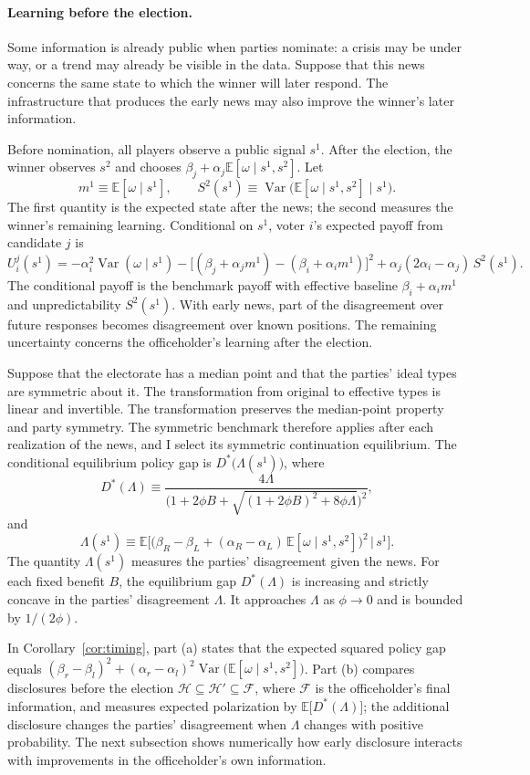\documentclass[12pt,letterpaper]{article}
\begin{document}
\paragraph{Learning before the election.}
Some information is already public when parties nominate: a crisis may be under way, or a trend may already be visible in the data. Suppose that this news concerns the same state to which the winner will later respond. The infrastructure that produces the early news may also improve the winner's later information.

Before nomination, all players observe a public signal $s^1$. After the election, the winner observes $s^2$ and chooses $\beta_j+\alpha_j\mathbb{E}[\omega\mid s^1,s^2]$. Let
\[
m^1\equiv\mathbb{E}[\omega\mid s^1],
\qquad
S^2(s^1)\equiv\operatorname{Var}\big(\mathbb{E}[\omega\mid s^1,s^2]\mid s^1\big).
\]
The first quantity is the expected state after the news; the second measures the winner's remaining learning. Conditional on $s^1$, voter $i$'s expected payoff from candidate $j$ is
\[
U_i^j(s^1)=-\alpha_i^2\operatorname{Var}(\omega\mid s^1)-\big[(\beta_j+\alpha_jm^1)-(\beta_i+\alpha_im^1)\big]^2+\alpha_j(2\alpha_i-\alpha_j)\,S^2(s^1).
\]
The conditional payoff is the benchmark payoff with effective baseline $\beta_i+\alpha_im^1$ and unpredictability $S^2(s^1)$. With early news, part of the disagreement over future responses becomes disagreement over known positions. The remaining uncertainty concerns the officeholder's learning after the election.

Suppose that the electorate has a median point and that the parties' ideal types are symmetric about it. The transformation from original to effective types is linear and invertible. The transformation preserves the median-point property and party symmetry. The symmetric benchmark therefore applies after each realization of the news, and I select its symmetric continuation equilibrium. The conditional equilibrium policy gap is $D^*\big(\Lambda(s^1)\big)$, where
\[
D^*(\Lambda)\equiv\frac{4\Lambda}{\big(1+2\phi B+\sqrt{(1+2\phi B)^2+8\phi\Lambda}\big)^2},
\]
and
\[
\Lambda(s^1)\equiv\mathbb{E}\Big[\big(\beta_R-\beta_L+(\alpha_R-\alpha_L)\,\mathbb{E}[\omega\mid s^1,s^2]\big)^2\,\Big|\,s^1\Big].
\]
The quantity $\Lambda(s^1)$ measures the parties' disagreement given the news. For each fixed benefit $B$, the equilibrium gap $D^*(\Lambda)$ is increasing and strictly concave in the parties' disagreement $\Lambda$. It approaches $\Lambda$ as $\phi\to0$ and is bounded by $1/(2\phi)$.

In Corollary~\ref{cor:timing}, part (a) states that the expected squared policy gap equals $(\beta_r-\beta_l)^2+(\alpha_r-\alpha_l)^2\operatorname{Var}\big(\mathbb{E}[\omega\mid s^1,s^2]\big)$. Part (b) compares disclosures before the election $\mathcal H\subseteq\mathcal H'\subseteq\mathcal F$, where $\mathcal F$ is the officeholder's final information, and measures expected polarization by $\mathbb{E}\big[D^*(\Lambda)\big]$; the additional disclosure changes the parties' disagreement when $\Lambda$ changes with positive probability. The next subsection shows numerically how early disclosure interacts with improvements in the officeholder's own information.
\end{document}
